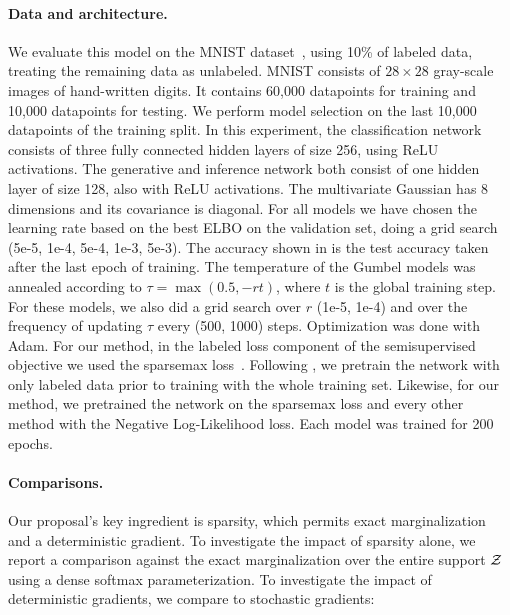 \paragraph*{Data and architecture.} We evaluate this model on the
MNIST dataset~\citep{lecun1998gradient}, using 10\% of labeled data,
treating the remaining data as unlabeled. MNIST consists of $28
    \times 28$ gray-scale images of hand-written digits. It contains
60,000 datapoints for training and 10,000 datapoints for testing. We
perform model selection on the last 10,000 datapoints of the training
split. In this experiment, the classification network consists of
three fully connected hidden layers of size 256, using ReLU
activations. The generative and inference network both consist of one
hidden layer of size 128, also with ReLU activations. The
multivariate Gaussian has 8 dimensions and its covariance is
diagonal. For all models we have chosen the learning rate based on
the best ELBO on the validation set, doing a grid search (5e-5, 1e-4,
5e-4, 1e-3, 5e-3). The accuracy shown in  is
the test accuracy taken after the last epoch of training. The
temperature of the Gumbel models was annealed according to $\tau =
    \max\left(0.5, -rt\right)$, where $t$ is the global training step.
For these models, we also did a grid search over $r$ (1e-5, 1e-4) and
over the frequency of updating $\tau$ every (500, 1000) steps.
Optimization was done with Adam. For our method, in the labeled loss
component of the semisupervised objective we used the sparsemax
loss~\citep{martins2016softmax}. Following \citet{RB19}, we pretrain
the network with only labeled data prior to training with the whole
training set. Likewise, for our method, we pretrained the network on
the sparsemax loss and every other method with the Negative
Log-Likelihood loss. Each model was trained for 200 epochs.

\paragraph*{Comparisons.} Our proposal's key ingredient is sparsity,
which permits exact marginalization and a deterministic gradient. To
investigate the impact of sparsity alone, we report a comparison
against the exact marginalization over the entire support $\mathcal{Z}$ using
a dense softmax parameterization. To investigate the impact of
deterministic gradients, we compare to stochastic gradients:

